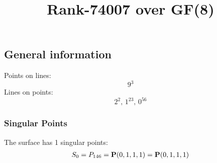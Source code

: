 \documentclass{article}
\newcommand\setTBstruts{\def\T{\rule{0pt}{2.6ex}}%
\def\B{\rule[-1.2ex]{0pt}{0pt}}}
\newcommand{\bP}{{\bf P}}
\begin{document}
 
\setTBstruts



{\allowdisplaybreaks%






\title{Rank-74007 over GF(8)}
\author{}%
\maketitle%
%
{}



\subsection*{General information}
Points on lines:
$$
9^3$$
Lines on points:
$$
2^2,\,1^{23},\,0^{56}$$
\subsubsection*{Singular Points}
The surface has 1 singular points:\\
\begin{align*}
S_{0} &= P_{146}=\bP(0, 1, 1, 1) = \bP(0, 1, 1, 1)\\
\end{align*}
}
\end{document}
